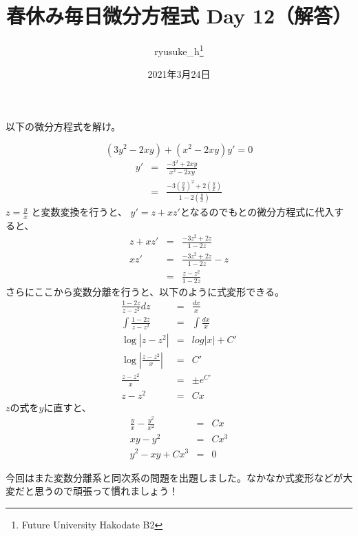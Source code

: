 \documentclass[a4j]{jsarticle}
\title{春休み毎日微分方程式 Day 12（解答）}
\author{ryusuke\_h\thanks{Future University Hakodate B2}}
\date{2021年3月24日}
\begin{document}
\begin{spacing}{1.6}
\maketitle

以下の微分方程式を解け。
\begin{qparts}
  \qpart
  \begin{equation*}
      (3y^2 - 2xy) + (x^2-2xy)y' = 0
  \end{equation*}
  \begin{eqnarray*}
    y' & = & \frac{-3^2 + 2xy}{x^2 - 2xy} \\
    & = & \frac{-3\left(\frac{y}{x}\right)^2 + 2\left(\frac{y}{x}\right)}{1 - 2\left(\frac{y}{x}\right)}
  \end{eqnarray*}
  $\displaystyle z = \frac{y}{x}$ と変数変換を行うと、 $y' = z + xz'$となるのでもとの微分方程式に代入すると、\\
  \begin{eqnarray*}
    z + xz' & = & \frac{-3z^2 + 2z}{1 - 2z} \\
    xz' & = & \frac{-3z^2 + 2z}{1 - 2z} - z \\
    & = & \frac{z - z^2}{1 - 2z}
  \end{eqnarray*}
  さらにここから変数分離を行うと、以下のように式変形できる。
  \begin{eqnarray*}
    \frac{1 - 2z}{z - z^2}dz & = & \frac{dx}{x} \\
    \int \frac{1 - 2z}{z - z^2} & = & \int \frac{dx}{x} \\
    \log |z - z^2| & = & log|x| + C' \\
    \log \left|\frac{z - z^2}{x}\right| & = & C' \\
    \frac{z - z^2}{x} & = & \pm e^{C'} \\
    z - z^2 & = & Cx
  \end{eqnarray*}
  $z$の式を$y$に直すと、
  \begin{eqnarray*}
    \frac{y}{x} - \frac{y^2}{x^2} & = & Cx \\
    xy - y^2 & = & Cx^3 \\
    y^2 - xy + Cx^3 & = & 0
  \end{eqnarray*}
  \end{qparts}
\end{spacing}
\begin{shadebox}
  今回はまた変数分離系と同次系の問題を出題しました。なかなか式変形などが大変だと思うので頑張って慣れましょう！
\end{shadebox}
\end{document}
